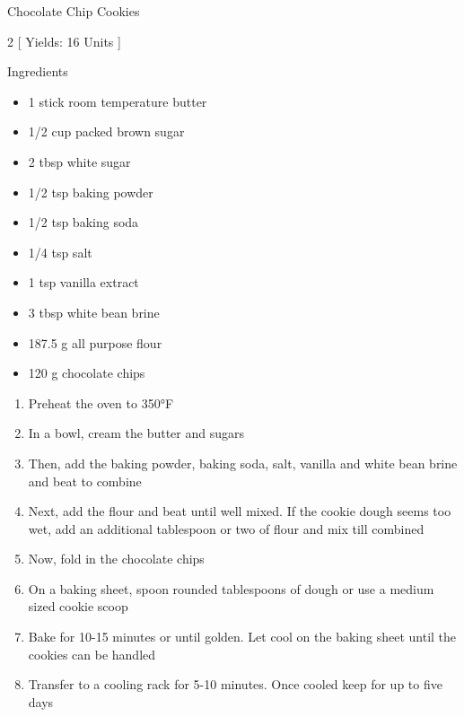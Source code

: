 \begin{Large}
    Chocolate Chip Cookies
\end{Large}

\begin{scriptsize}
\begin{multicols}{2}
[
\vspace{1em}
Yields: 16 Units
\vspace{-1.5em}
]

Ingredients
\begin{itemize}
    \item 1 stick room temperature butter
    \item 1/2 cup packed brown sugar
    \item 2 tbsp white sugar

    \item 1/2 tsp baking powder
    \item 1/2 tsp baking soda
    \item 1/4 tsp salt
    \item 1 tsp vanilla extract
    \item 3 tbsp white bean brine

    \item 187.5 g all purpose flour %
    \item 120 g chocolate chips

\end{itemize}
\end{multicols}
\end{scriptsize}

\begin{footnotesize}
\begin{enumerate}
    \item Preheat the oven to 350°F
    \item In a bowl, cream the butter and sugars
    \item Then, add the baking powder, baking soda, salt, vanilla and white bean brine and beat to combine
    \item Next, add the flour and beat until well mixed. If the cookie dough seems too wet, add an additional tablespoon or two of flour and mix till combined
    \item Now, fold in the chocolate chips
    \item On a baking sheet, spoon rounded tablespoons of dough or use a medium sized cookie scoop
    \item Bake for 10-15 minutes or until golden. Let cool on the baking sheet until the cookies can be handled
    \item Transfer to a cooling rack for 5-10 minutes. Once cooled keep for up to five days

\end{enumerate}
\end{footnotesize}

\vspace{2em}
